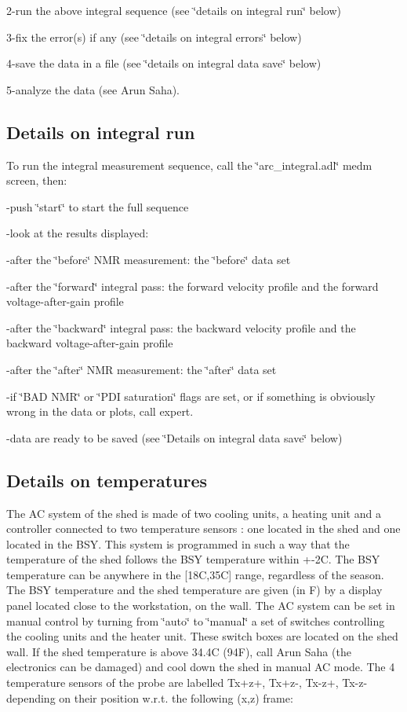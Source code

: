 2-run the above integral sequence (see \char`\"{}details on integral run\char`\"{}
below) 

3-fix the error(s) if any (see \char`\"{}details on integral errors\char`\"{}
below) 

4-save the data in a file (see \char`\"{}details on integral data save\char`\"{}
below) 

5-analyze the data (see Arun Saha). 


\subsection{Details on integral run }

To run the integral measurement sequence, call the 
\char`\"{}arc\_integral.adl\char`\"{}
medm screen, then: 

-push \char`\"{}start\char`\"{} to start the full sequence 

-look at the results displayed: 

-after the \char`\"{}before\char`\"{} NMR measurement: the 
\char`\"{}before\char`\"{}
data set 

-after the \char`\"{}forward\char`\"{} integral pass: the forward velocity profile
and the forward voltage-after-gain profile 

-after the \char`\"{}backward\char`\"{} integral pass: the backward velocity
profile and the backward voltage-after-gain profile 

-after the \char`\"{}after\char`\"{} NMR measurement: the 
\char`\"{}after\char`\"{}
data set 

-if \char`\"{}BAD NMR\char`\"{} or \char`\"{}PDI saturation\char`\"{} flags
are set, or if something is obviously wrong in the data or plots, call expert. 

-data are ready to be saved (see \char`\"{}Details on integral data save\char`\"{}
below) 


\subsection{Details on temperatures }

The AC system of the shed is made of two cooling units, a heating unit and a
controller connected to two temperature sensors : one located in the shed and
one located in the BSY. This system is programmed in such a way that the 
temperature
of the shed follows the BSY temperature within +-2C. The BSY temperature can
be anywhere in the {[}18C,35C{]} range, regardless of the season. The BSY 
temperature
and the shed temperature are given (in F) by a display panel located close to
the workstation, on the wall. The AC system can be set in manual control by
turning from \char`\"{}auto\char`\"{} to \char`\"{}manual\char`\"{} a set of
switches controlling the cooling units and the heater unit. These switch boxes
are located on the shed wall. If the shed temperature is above 34.4C (94F),
call Arun Saha (the electronics can be damaged) and cool down the shed in manual
AC mode. The 4 temperature sensors of the probe are labelled Tx+z+, Tx+z-, Tx-z+,
Tx-z- depending on their position w.r.t. the following (x,z) frame: 

